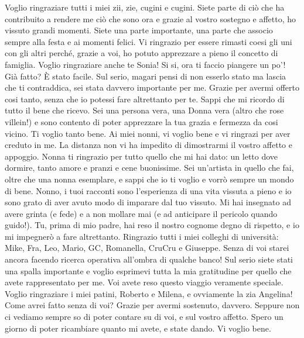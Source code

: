 \newline\newline
Voglio ringraziare tutti i miei zii, zie, cugini e cugini. Siete parte di ciò che ha contribuito a rendere me ciò che sono ora e grazie al vostro sostegno e affetto, ho vissuto grandi momenti. Siete una parte importante, una parte che associo sempre alla festa e ai momenti felici. Vi ringrazio per essere rimasti coesi gli uni con gli altri perché, grazie a voi, ho potuto apprezzare a pieno il concetto di famiglia.
\newline\newline
Voglio ringraziare anche te Sonia! Si si, ora ti faccio piangere un po'! Già fatto? È stato facile. Sul serio, magari pensi di non esserlo stato ma lascia che ti contraddica, sei stata davvero importante per me. Grazie per avermi offerto cosi tanto, senza che io potessi fare altrettanto per te. Sappi che mi ricordo di tutto il bene che ricevo. Sei una persona vera, una Donna vera (altro che rose villein!) e sono contento di poter apprezzare la tua grazia e fermezza da cosi vicino. Ti voglio tanto bene.
\newline\newline
Ai miei nonni, vi voglio bene e vi ringrazi per aver creduto in me. La distanza non vi ha impedito di dimostrarmi il vostro affetto e appoggio. Nonna ti ringrazio per tutto quello che mi hai dato: un letto dove dormire, tanto amore e pranzi e cene buonissime. Sei un'artista in quello che fai, oltre che una nonna esemplare, e sappi che io ti voglio e vorrò sempre un mondo di bene. Nonno, i tuoi racconti sono l'esperienza di una vita vissuta a pieno e io sono grato di aver avuto modo di imparare dal tuo vissuto. Mi hai insegnato ad avere grinta (e fede) e a non mollare mai (e ad anticipare il pericolo quando guido!). Tu, prima di mio padre, hai reso il nostro cognome degno di rispetto, e io mi impegnerò a fare altrettanto.
Ringrazio tutti i miei colleghi di università: Mike, Fra, Leo, Mario, GC, Romanella, CruCru e Giuseppe. Senza di voi starei ancora facendo ricerca operativa all'ombra di qualche banco! Sul serio siete stati una spalla importante e voglio esprimevi tutta la mia gratitudine per quello che avete rappresentato per me. Voi avete reso questo viaggio veramente speciale.
\newline\newline
Voglio ringraziare i miei patini, Roberto e Milena, e ovviamente la zia Angelina! Come avrei fatto senza di voi? Grazie per avermi sostenuto, davvero. Seppure non ci vediamo sempre so di poter contare su di voi, e sul vostro affetto. Spero un giorno di poter ricambiare quanto mi avete, e state dando. Vi voglio bene.
